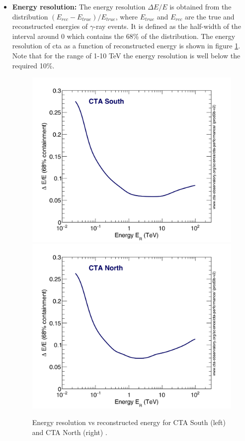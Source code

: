 \documentclass[main.tex]{subfiles}
\begin{document}
\begin{itemize}
\item \textbf{Energy resolution:} The energy resolution $\Delta E/E$ is obtained from the distribution $(E_{rec}-E_{true})/E_{true}$, where $E_{true}$ and $E_{rec}$ are the true and reconstructed energies of $\gamma$-ray events. It is defined as the half-width of the interval around 0 which contains the 68\% of the distribution. The energy resolution of \gls{cta} as a function of reconstructed energy is shown in figure \ref{fig:energyres}. Note that for the range of 1-10 TeV the energy resolution is well below the required 10\%.\\
    
  \begin{figure}[!htb]
    \includegraphics[width=\linewidth]{Pictures/CTA-Performance-prod3b-v2-South-20deg-EnergyResolution.pdf}
    \endminipage\hfill
    \includegraphics[width=\linewidth]{Pictures/CTA-Performance-prod3b-v2-North-20deg-EnergyResolution.pdf}
    \endminipage\hfill
    \caption{\label{fig:energyres} Energy resolution vs reconstructed energy for CTA South (left) and CTA North (right) \cite{CTAPerformance}.}
  \end{figure}
  

\end{itemize}
\end{document}
